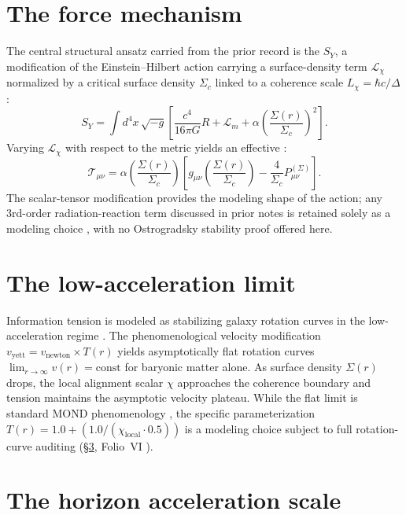 \documentclass{alienfolio}
\begin{document}
\section{The force mechanism}
\label{sec:mechanism}

The central structural ansatz carried from the prior record is the
 $S_Y$, a modification of the Einstein--Hilbert
action carrying a surface-density term $\mathcal{L}_\chi$ normalized by a
critical surface density $\Sigma_c$ linked to a coherence scale
$L_\chi = \hbar c / \Delta$:
\begin{equation}
S_Y = \int d^4x\,\sqrt{-g}\left[\frac{c^4}{16\pi G}R
+ \mathcal{L}_m
+ \alpha\left(\frac{\Sigma(r)}{\Sigma_c}\right)^2\right].
\end{equation}
Varying $\mathcal{L}_\chi$ with respect to the metric yields an effective
 :
\begin{equation}
\mathcal{T}_{\mu\nu} = \alpha\left(\frac{\Sigma(r)}{\Sigma_c}\right)
\left[g_{\mu\nu}\left(\frac{\Sigma(r)}{\Sigma_c}\right)
- \frac{4}{\Sigma_c}P_{\mu\nu}^{(\Sigma)}\right].
\end{equation}
The scalar-tensor modification provides the modeling shape of the action;
any 3rd-order radiation-reaction term discussed in prior notes is
retained solely as a modeling choice , with no
Ostrogradsky stability proof offered here.

\section{The low-acceleration limit}
\label{sec:lowacc}

Information tension is modeled as stabilizing galaxy rotation curves in
the low-acceleration regime . The phenomenological
velocity modification $v_{\mathrm{yett}} = v_{\mathrm{newton}} \times
T(r)$ yields asymptotically flat rotation curves $\lim_{r\to\infty} v(r)
= \mathrm{const}$ for baryonic matter alone. As surface density
$\Sigma(r)$ drops, the local alignment scalar $\chi$ approaches the
coherence boundary and tension maintains the asymptotic velocity plateau.
While the flat limit is standard MOND phenomenology \cite{milgrom83},
the specific parameterization $T(r) = 1.0 + (1.0/(\chi_{\mathrm{local}}
\cdot 0.5))$ is a modeling choice  subject to full
rotation-curve auditing (\S\ref{sec:horizon}, Folio~VI \cite{folio-vi}).

\section{The horizon acceleration scale}
\label{sec:horizon}
\end{document}
